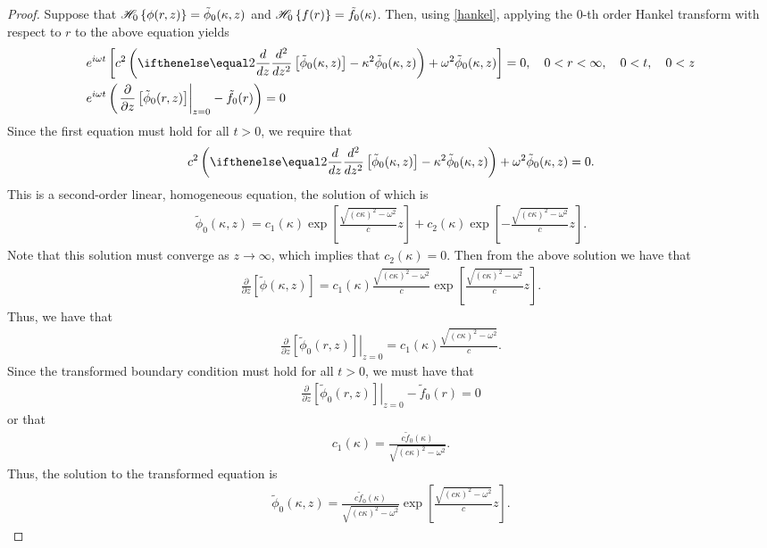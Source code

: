 \begin{proof}
  Suppose that $\mathscr{H}_{ {0} }\left\{ {\phi(r,z)} \right\} = \tilde{\phi}_0(\kappa, z)$ and $\mathscr{H}_{ {0} }\left\{ {f(r)} \right\} = \tilde{f}_0(\kappa)$.
  Then, using \eqref{hankel}, applying the 0-th order Hankel transform with respect to $r$ to the above equation yields
  \begin{align*}
    &e^{i\omega t} \left[c^2 \left(\der{z}{2}\left[\tilde{\phi}_0(\kappa, z)\right] - \kappa^2 \tilde{\phi}_0(\kappa, z) \right) + \omega^2 \tilde{\phi}_0(\kappa, z)\right] = 0, \quad 0 < r < \infty, \quad 0 < t, \quad 0 < z \\
    &e^{i\omega t}\left(\left.\frac{\partial}{\partial z}\left[\tilde{\phi}_0(r,z)\right]\right\rvert_{z=0}- \tilde{f}_0(r)\right) = 0
  \end{align*}
  Since the first equation must hold for all $t>0$, we require that
  \begin{align*}
    c^2 \left(\der{z}{2}\left[\tilde{\phi}_0(\kappa, z)\right] - \kappa^2 \tilde{\phi}_0(\kappa, z) \right) + \omega^2 \tilde{\phi}_0(\kappa, z) = 0.
  \end{align*}
  This is a second-order linear, homogeneous equation, the solution of which is
  \begin{align*}
    \tilde{\phi}_0(\kappa, z) = c_1(\kappa) \exp\left[\frac{\sqrt{(c\kappa)^2-\omega^2}}{c} z\right] + c_2(\kappa) \exp\left[-\frac{\sqrt{(c\kappa)^2-\omega^2}}{c} z\right].
  \end{align*}
  Note that this solution must converge as $z \to \infty$, which implies that $c_2(\kappa) = 0$.
  Then from the above solution we have that
  \begin{align*}
    \frac{\partial}{\partial z}\left[\tilde{\phi}(\kappa, z)\right] = c_1(\kappa)\frac{\sqrt{(c\kappa)^2-\omega^2}}{c} \exp\left[\frac{\sqrt{(c\kappa)^2-\omega^2}}{c} z\right].
  \end{align*}
  Thus, we have that
  \begin{align*}
    \left.\frac{\partial}{\partial z}\left[\tilde{\phi}_0(r,z)\right]\right\rvert_{z=0} = c_1(\kappa)\frac{\sqrt{(c\kappa)^2-\omega^2}}{c}.
  \end{align*}
  Since the transformed boundary condition must hold for all $t > 0$, we must have that
  \begin{align*}
    \left.\frac{\partial}{\partial z}\left[\tilde{\phi}_0(r,z)\right]\right\rvert_{z=0}- \tilde{f}_0(r) = 0
  \end{align*}
  or that
  \begin{align*}
    c_1(\kappa) = \frac{c\tilde{f}_0(\kappa)}{\sqrt{(c\kappa)^2-\omega^2}}.
  \end{align*}
  Thus, the solution to the transformed equation is
  \begin{align*}
    \tilde{\phi}_0(\kappa, z) = \frac{c\tilde{f}_0(\kappa)}{\sqrt{(c\kappa)^2-\omega^2}}\exp\left[\frac{\sqrt{(c\kappa)^2-\omega^2}}{c} z\right].
  \end{align*}


\end{proof}
